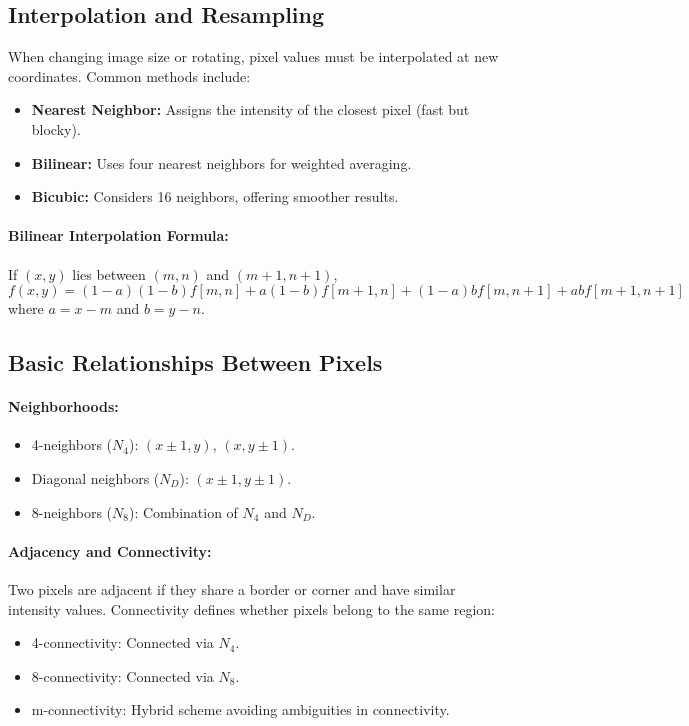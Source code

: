 \documentclass[12pt,a4paper]{AnantDocumentation}
\begin{document}
\subsection{Interpolation and Resampling}
When changing image size or rotating, pixel values must be interpolated at new coordinates. Common methods include:
\begin{itemize}
\item \textbf{Nearest Neighbor:} Assigns the intensity of the closest pixel (fast but blocky).
\item \textbf{Bilinear:} Uses four nearest neighbors for weighted averaging.
\item \textbf{Bicubic:} Considers 16 neighbors, offering smoother results.
\end{itemize}

\paragraph{Bilinear Interpolation Formula:}
If $(x,y)$ lies between $(m,n)$ and $(m+1,n+1)$,
\begin{equation}
f(x,y) = (1-a)(1-b)f[m,n] + a(1-b)f[m+1,n] + (1-a)b f[m,n+1] + ab f[m+1,n+1]
\end{equation}
where $a = x - m$ and $b = y - n$.

\subsection{Basic Relationships Between Pixels}
\paragraph{Neighborhoods:}
\begin{itemize}
\item 4-neighbors ($N_4$): $(x\pm1, y)$, $(x, y\pm1)$.
\item Diagonal neighbors ($N_D$): $(x\pm1, y\pm1)$.
\item 8-neighbors ($N_8$): Combination of $N_4$ and $N_D$.
\end{itemize}

\paragraph{Adjacency and Connectivity:} Two pixels are adjacent if they share a border or corner and have similar intensity values. Connectivity defines whether pixels belong to the same region:
\begin{itemize}
\item 4-connectivity: Connected via $N_4$.
\item 8-connectivity: Connected via $N_8$.
\item m-connectivity: Hybrid scheme avoiding ambiguities in connectivity.
\end{itemize}
\end{document}
